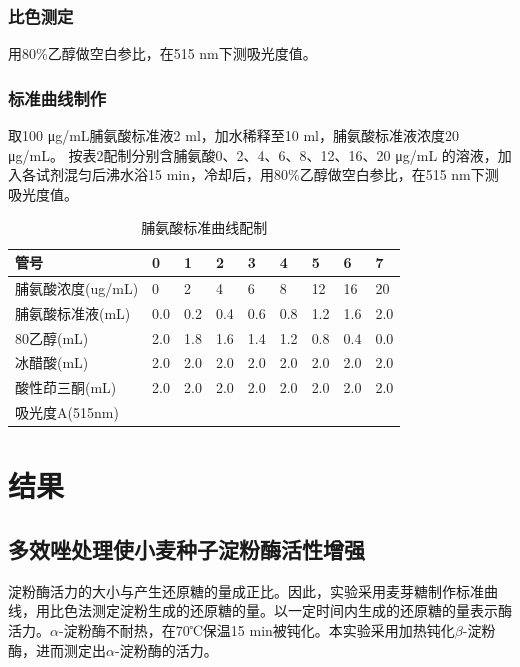 \documentclass[UTF8]{ctexart}
\begin{document}
    \subsubsection*{比色测定}
    用80\%乙醇做空白参比，在515 nm下测吸光度值。
    \subsubsection*{标准曲线制作}
    取100 μg/mL脯氨酸标准液2 ml，加水稀释至10 ml，脯氨酸标准液浓度20 μg/mL。
    按表2配制分别含脯氨酸0、2、4、6、8、12、16、20 μg/mL 的溶液，加入各试剂混匀后沸水浴15 min，冷却后，用80\%乙醇做空白参比，在515 nm下测吸光度值。 

    \begin{table}[]
        \centering
        \setlength{\abovecaptionskip}{0.cm}
        \caption{脯氨酸标准曲线配制}
        \begin{tabular}{lllllllll}
        \hline
        管号           & 0   & 1   & 2   & 3   & 4   & 5   & 6   & 7   \\ \hline
        脯氨酸浓度(ug/mL) & 0   & 2   & 4   & 6   & 8   & 12  & 16  & 20  \\
        脯氨酸标准液(mL)   & 0.0 & 0.2 & 0.4 & 0.6 & 0.8 & 1.2 & 1.6 & 2.0 \\
        80乙醇(mL)     & 2.0 & 1.8 & 1.6 & 1.4 & 1.2 & 0.8 & 0.4 & 0.0 \\
        冰醋酸(mL)      & 2.0 & 2.0 & 2.0 & 2.0 & 2.0 & 2.0 & 2.0 & 2.0 \\
        酸性茚三酮(mL)    & 2.0 & 2.0 & 2.0 & 2.0 & 2.0 & 2.0 & 2.0 & 2.0 \\
        吸光度A(515nm)  &     &     &     &     &     &     &     &     \\ \hline
        \end{tabular}
    \end{table}

    \section{结果}
    \subsection{多效唑处理使小麦种子淀粉酶活性增强}
    淀粉酶活力的大小与产生还原糖的量成正比。因此，实验采用麦芽糖制作标准曲线，用比色法测定淀粉生成的还原糖的量。以一定时间内生成的还原糖的量表示酶活力。$\alpha$-淀粉酶不耐热，在70℃保温15 min被钝化。本实验采用加热钝化$\beta$-淀粉酶，进而测定出$\alpha$-淀粉酶的活力。
    
\end{document}
